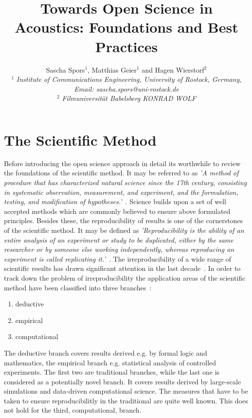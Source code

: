 \documentclass[a4paper, 10pt, twocolumn]{article}
\date{}                                         %
\title{\vspace{-8mm}\textbf{\large
Towards Open Science in Acoustics: Foundations and Best Practices}}
\author{
Sascha Spors$^1$, Matthias Geier$^1$ and Hagen Wierstorf$^2$\\
$^1$ \emph{\small Institute of Communications Engineering, University of Rostock, Germany, Email: sascha.spors@uni-rostock.de}\\
$^2$ \emph{\small Filmuniversität Babelsberg KONRAD WOLF}}
\begin{document}
\maketitle
\thispagestyle{empty}           %

\section*{The Scientific Method} \label{sec:intro} 

Before introducing the open science approach in detail its worthwhile to review the
foundations of the scientific method. It may be referred to  as 
\emph{'A method of procedure that has characterized natural science since the 17th 
century, consisting in systematic observation, measurement, and experiment, and the 
formulation, testing, and modification of hypotheses.'}~\cite{scientific_method:OXD}. 
Science builds upon a set of well accepted methods which are commonly believed to
ensure above formulated principles. Besides these, the reproducibility of results is 
one of the cornerstones of the scientific method. 
It may be defined as \emph{'Reproducibility is the ability of an entire analysis of 
an experiment or study to be duplicated, either by the same researcher or by someone 
else working independently, whereas reproducing an experiment is called replicating 
it.'}~\cite{Leek15:PNAS}. 
The irreproducibility of a wide range of scientific results has drawn significant 
attention in the last decade~\cite{Borgwardt:Book,retraction:WWW,ioannidis05:PLOS, open15:AAAS, chalmers09:OG, freedman15:PLOS, howells14:Nature}. 
In order to track down the problem of irreproducibility the application areas of 
the scientific method have been classified into three branches~\cite{Donoho:CSE,Stodden2014:talk}:
\begin{enumerate}
\item deductive
\item empirical
\item computational
\end{enumerate}
The deductive branch covers results derived e.g. by formal logic and mathematics, the empirical
branch e.g. statistical analysis of controlled experiments. The first two are traditional branches, 
while the last one is considered as a potentially novel branch. It covers results derived by large-scale simulations
and data-driven computational science. The measures that have to be taken to ensure reproducibilitly
in the traditional are quite well known. This does not hold for the third, computational, branch.
\end{document}

